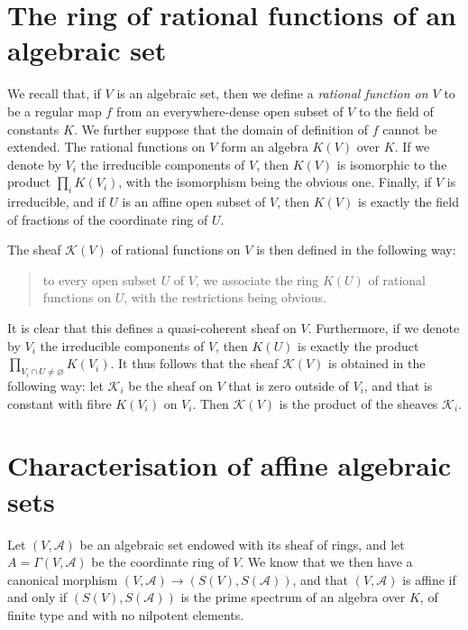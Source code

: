 \documentclass[british]{article}
\newcommand{\oldpage}[1]{\marginpar{\footnotesize$\Big\vert$ \textit{p.~#1}}}
\begin{document}
\section{The ring of rational functions of an algebraic
set}\label{section-3}

We recall that, if \(V\) is an algebraic set, then we define a
\emph{rational function on \(V\)} to be a regular map \(f\) from an
everywhere-dense open subset of \(V\) to the field of constants \(K\).
We further suppose that the domain of definition of \(f\) cannot be
extended. The rational functions on \(V\) form an algebra \(K(V)\) over
\(K\). If we denote by \(V_i\) the irreducible components of \(V\), then
\(K(V)\) is isomorphic to the product \(\prod_i K(V_i)\), with the
isomorphism being the obvious one. Finally, if \(V\) is irreducible, and
if \(U\) is an affine open subset of \(V\), then \(K(V)\) is exactly the
field of fractions of the coordinate ring of \(U\).

The sheaf \({\mathscr{K}}(V)\) of rational functions on \(V\) is then
defined in the following way:

\begin{quote}
to every open subset \(U\) of \(V\), we associate the ring \(K(U)\) of
rational functions on \(U\), with the restrictions being obvious.
\end{quote}

\oldpage{2-04}

It is clear that this defines a quasi-coherent sheaf on \(V\).
Furthermore, if we denote by \(V_i\) the irreducible components of
\(V\), then \(K(U)\) is exactly the product
\(\prod_{V_i\cap U\neq\varnothing}K(V_i)\). It thus follows that the
sheaf \({\mathscr{K}}(V)\) is obtained in the following way: let
\({\mathscr{K}}_i\) be the sheaf on \(V\) that is zero outside of
\(V_i\), and that is constant with fibre \(K(V_i)\) on \(V_i\). Then
\({\mathscr{K}}(V)\) is the product of the sheaves \({\mathscr{K}}_i\).

\section{Characterisation of affine algebraic sets}\label{section-4}

Let \((V,{\mathscr{A}})\) be an algebraic set endowed with its sheaf of
rings, and let \(A=\Gamma(V,{\mathscr{A}})\) be the coordinate ring of
\(V\). We know that we then have a canonical morphism
\((V,{\mathscr{A}})\to(S(V),S({\mathscr{A}}))\), and that
\((V,{\mathscr{A}})\) is affine if and only if
\((S(V),S({\mathscr{A}}))\) is the prime spectrum of an algebra over
\(K\), of finite type and with no nilpotent elements.
\end{document}
